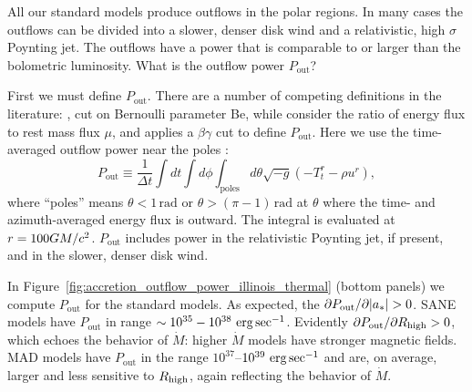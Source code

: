 All our standard models produce outflows in the polar regions.  In many cases the outflows can be divided into a slower, denser disk wind and a relativistic, high $\sigma$ Poynting jet.  The outflows have a power that is comparable to or larger than the bolometric luminosity.  What is the outflow power $P_\mathrm{out}$?


First we must define $P_\mathrm{out}$.  There are a number of competing definitions in the literature: \citet{refId0}, \citet{2014A&A...570A...7M} cut on  Bernoulli parameter Be, while \citet{10.1111/j.1365-2966.2012.22002.x} consider the ratio of energy flux to rest mass flux $\mu$, and  applies a $\beta\gamma$ cut to define $P_\mathrm{out}$.  Here we use the time-averaged outflow power near the poles :
\begin{equation}
  P_\mathrm{out} \equiv \frac{1}{\Delta t}\int dt \int d\phi \int_\mathrm{poles} d\theta \sqrt{-g}\left(-T^{r}_{t}-\rho u^{r}\right),
\end{equation}
where ``poles'' means $\theta < 1\,\mathrm{rad}$ or $\theta > (\pi-1)\,\mathrm{rad}$ at $\theta$ where the time- and azimuth-averaged energy flux is outward.  The integral is evaluated at $r = 100GM/c^2$. $P_\mathrm{out}$ includes power in the relativistic Poynting jet, if present, and in the slower, denser disk wind.

In Figure~\ref{fig:accretion_outflow_power_illinois_thermal}
(bottom panels) we compute $P_\mathrm{out}$ for the standard models. As expected, the $\partial P_\mathrm{out}/\partial |a_*| > 0$. SANE models have $P_\mathrm{out}$ in range $\sim 10^{35}-10^{38} \,\,\mathrm{erg}\,\mathrm{sec}^{-1}$.  Evidently $\partial P_\mathrm{out}/\partial R_\mathrm{high} > 0$, which echoes the behavior of $\dot{M}$: higher $\dot{M}$ models have stronger magnetic fields. MAD models have $P_\mathrm{out}$ in the range $10^{37}$--$10^{39} \,\,\mathrm{erg}\,\mathrm{sec}^{-1}$ and are, on average, larger and less sensitive to $R_\mathrm{high}$, again reflecting the behavior of $\dot{M}$.

